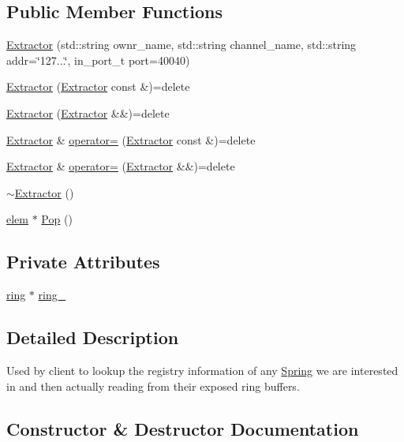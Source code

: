 \subsection*{Public Member Functions}
\begin{DoxyCompactItemize}
\item 
\hyperlink{classExtractor_aaefc9c7f9b152b6380cb65c1e36ac95b}{Extractor} (std\+::string ownr\+\_\+name, std\+::string channel\+\_\+name, std\+::string addr=\char`\"{}127...\char`\"{}, in\+\_\+port\+\_\+t port=40040)
\item 
\hyperlink{classExtractor_af0ccf57906e47cef731d7476956aca03}{Extractor} (\hyperlink{classExtractor}{Extractor} const \&)=delete
\item 
\hyperlink{classExtractor_ae3a09acb7a8e25f72b7cfc829f8aed8c}{Extractor} (\hyperlink{classExtractor}{Extractor} \&\&)=delete
\item 
\hyperlink{classExtractor}{Extractor} \& \hyperlink{classExtractor_abbc21689d5da9fb8115362a2e262e43f}{operator=} (\hyperlink{classExtractor}{Extractor} const \&)=delete
\item 
\hyperlink{classExtractor}{Extractor} \& \hyperlink{classExtractor_a4fae2fb922e5c5886c4a120aca43d877}{operator=} (\hyperlink{classExtractor}{Extractor} \&\&)=delete
\item 
\hyperlink{classExtractor_a0da249c590c92ed0714e8bd69ac236f4}{$\sim$\+Extractor} ()
\item 
\hyperlink{structelem}{elem} $\ast$ \hyperlink{classExtractor_a7632ce0dc24df1eeb659bb124e6b3031}{Pop} ()
\end{DoxyCompactItemize}
\subsection*{Private Attributes}
\begin{DoxyCompactItemize}
\item 
\hyperlink{structring}{ring} $\ast$ \hyperlink{classExtractor_a0e1370bcf808c900d1d3199350ebef41}{ring\+\_\+}
\end{DoxyCompactItemize}


\subsection{Detailed Description}
Used by client to lookup the registry information of any \hyperlink{classSpring}{Spring} we are interested in and then actually reading from their exposed ring buffers. 

\subsection{Constructor \& Destructor Documentation}
\mbox{\label{classExtractor_aaefc9c7f9b152b6380cb65c1e36ac95b}} 

